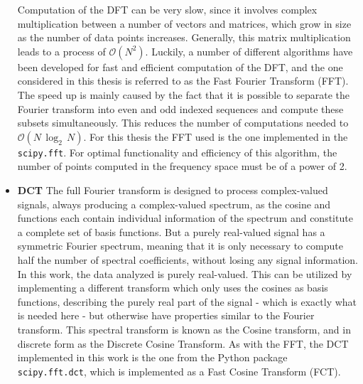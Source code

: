 \documentclass[../../CompleteThesis2/Complete_2ndDraft]{subfiles}
\begin{document}
\begin{itemize}
	Computation of the DFT can be very slow, since it involves complex multiplication between a number of vectors and matrices, which grow in size as the number of data points increases. Generally, this matrix multiplication leads to a process of $\mathcal{O}(N^2)$. Luckily, a number of different algorithms have been developed for fast and efficient computation of the DFT, and the one considered in this thesis is referred to as the Fast Fourier Transform (FFT). The speed up is mainly caused by the fact that it is possible to separate the Fourier transform into even and odd indexed sequences and compute these subsets simultaneously. This reduces the number of computations needed to $\mathcal{O}(N\,\log_2\, N)$. For this thesis the FFT used is the one implemented in the \lstinline[language=python]|scipy.fft|. For optimal functionality and efficiency of this algorithm, the number of points computed in the frequency space must be of a power of 2.
	
	\item \textbf{DCT} The full Fourier transform is designed to process complex-valued signals, always producing a complex-valued spectrum, as the cosine and functions each contain individual information of the spectrum and constitute a complete set of basis functions. But a purely real-valued signal has a symmetric Fourier spectrum, meaning that it is only necessary to compute	half the number of spectral coefficients, without losing any signal information. In this work, the data analyzed is purely real-valued. This can be utilized by implementing a different transform which only uses the cosines as basis functions, describing the purely real part of the signal - which is exactly what is needed here - but otherwise have properties similar to the Fourier transform. This spectral transform is known as the Cosine transform, and in discrete form as the Discrete Cosine Transform. As with the FFT, the DCT implemented in this work is the one from the Python package \lstinline[language=python]|scipy.fft.dct|, which is implemented as a Fast Cosine Transform (FCT).
	

\end{itemize}
\end{document}
